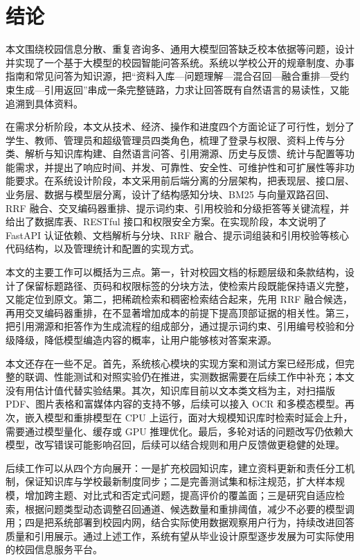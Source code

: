 \clearpage
\chapter*{结\quad 论}
{}

本文围绕校园信息分散、重复咨询多、通用大模型回答缺乏校本依据等问题，设计并实现了一个基于大模型的校园智能问答系统。系统以学校公开的规章制度、办事指南和常见问答为知识源，把“资料入库—问题理解—混合召回—融合重排—受约束生成—引用返回”串成一条完整链路，力求让回答既有自然语言的易读性，又能追溯到具体资料。

在需求分析阶段，本文从技术、经济、操作和进度四个方面论证了可行性，划分了学生、教师、管理员和超级管理员四类角色，梳理了登录与权限、资料上传与分类、解析与知识库构建、自然语言问答、引用溯源、历史与反馈、统计与配置等功能需求，并提出了响应时间、并发、可靠性、安全性、可维护性和可扩展性等非功能要求。在系统设计阶段，本文采用前后端分离的分层架构，把表现层、接口层、业务层、数据与模型层分离，设计了结构感知分块、BM25 与向量双路召回、RRF 融合、交叉编码器重排、提示词约束、引用校验和分级拒答等关键流程，并给出了数据库表、RESTful 接口和权限安全方案。在实现阶段，本文说明了 FastAPI 认证依赖、文档解析与分块、RRF 融合、提示词组装和引用校验等核心代码结构，以及管理统计和配置的实现方式。

本文的主要工作可以概括为三点。第一，针对校园文档的标题层级和条款结构，设计了保留标题路径、页码和权限标签的分块方法，使检索片段既能保持语义完整，又能定位到原文。第二，把稀疏检索和稠密检索结合起来，先用 RRF 融合候选，再用交叉编码器重排，在不显著增加成本的前提下提高顶部证据的相关性。第三，把引用溯源和拒答作为生成流程的组成部分，通过提示词约束、引用编号校验和分级降级，降低模型编造内容的概率，让用户能够核对答案来源。

本文还存在一些不足。首先，系统核心模块的实现方案和测试方案已经形成，但完整的联调、性能测试和对照实验仍在推进，实测数据需要在后续工作中补充；本文没有用估计值代替实验结果。其次，知识库目前以文本类文档为主，对扫描版 PDF、图片表格和富媒体内容的支持不够，后续可以接入 OCR 和多模态模型。再次，嵌入模型和重排模型在 CPU 上运行，面对大规模知识库时检索时延会上升，需要通过模型量化、缓存或 GPU 推理优化。最后，多轮对话的问题改写仍依赖大模型，改写错误可能影响召回，后续可以结合规则和用户反馈做更稳健的处理。

后续工作可以从四个方向展开：一是扩充校园知识库，建立资料更新和责任分工机制，保证知识库与学校最新制度同步；二是完善测试集和标注规范，扩大样本规模，增加跨主题、对比式和否定式问题，提高评价的覆盖面；三是研究自适应检索，根据问题类型动态调整召回通道、候选数量和重排阈值，减少不必要的模型调用；四是把系统部署到校园内网，结合实际使用数据观察用户行为，持续改进回答质量和引用展示。通过上述工作，系统有望从毕业设计原型逐步发展为可实际使用的校园信息服务平台。
